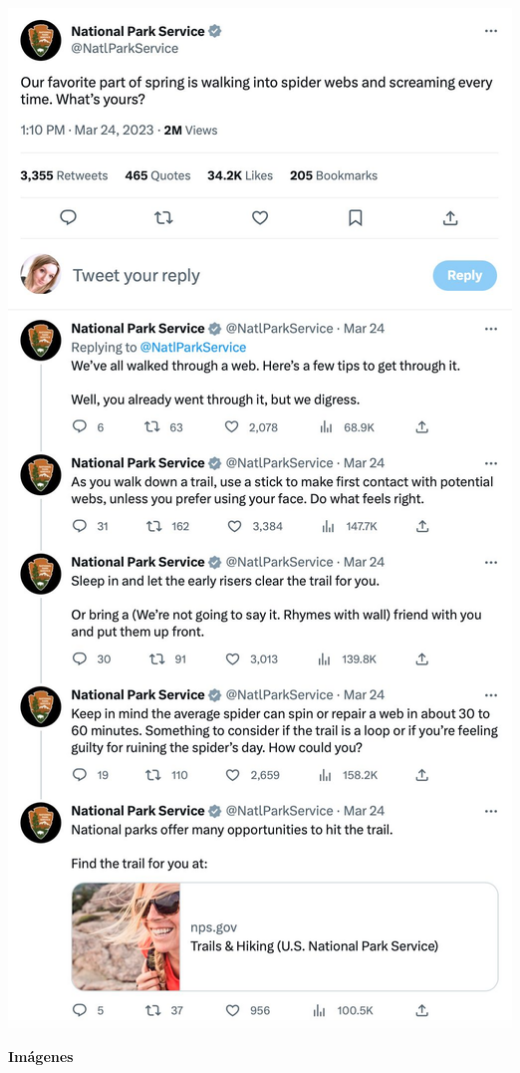 \documentclass[
  letterpaper,
  DIV=11,
  numbers=noendperiod]{scrartcl}
\begin{document}
\includegraphics[width=5.32292in,height=\textheight]{images/clipboard-4167942809.png}

{\textbf{Imágenes}}
\end{document}

